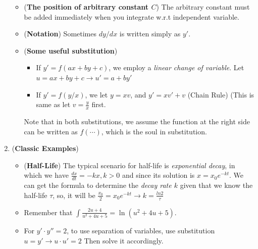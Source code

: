 \documentclass[10pt, landscape]{article}
\begin{document}
\begin{multicols}{4}
\begin{enumerate}
    \begin{itemize}
        \item (\textbf{The position of arbitrary constant $C$}) The arbitrary constant must be added immediately when you integrate w.r.t independent variable.
        \item (\textbf{Notation}) Sometimes $dy/dx$ is written simply as $y'$.
        \item (\textbf{Some useful substitution})
        \begin{itemize}
            \item If $y'=f(ax+by+c)$, we employ a \textit{linear change of variable}. Let $u=ax+by+c\rightarrow u'=a+by'$
            \item If $y'=f(y/x)$, we let $y=xv$, and $y'=xv'+v$ (Chain Rule) (This is same as let $v=\frac{y}{x}$ first.
        \end{itemize}
        Note that in both substitutions, we assume the function at the right side can be written as $f(\cdots)$, which is the soul in substitution.
    \end{itemize}
    \item (\textbf{Classic Examples})
    \begin{itemize}
        \item (\textbf{Half-Life}) The typical scenario for half-life is \textit{exponential decay}, in which we have $\frac{dx}{dt}=-kx,k>0$ and since its solution is $x=x_0e^{-kt}$. We can get the formula to determine the \textit{decay rate $k$} given that we know the half-life $\tau$, so, it will be $\frac{x_0}{2}=x_0e^{-kt}\rightarrow k=\frac{ln2}{\tau}$
        \item Remember that $\int\frac{2u+4}{u^2+4u+5}=\ln(u^2+4u+5)$.
        \item For $y'\cdot y''=2$, to use separation of variables, use substitution $u=y'\rightarrow u\cdot u'=2$ Then solve it accordingly.
    \end{itemize}
\end{enumerate}

\end{multicols}
\end{document}
